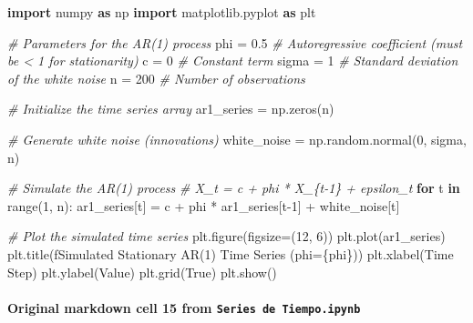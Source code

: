 \documentclass[
  11pt,
]{article}
\newenvironment{Shaded}{}{}
\newcommand{\BuiltInTok}[1]{\textcolor[rgb]{0.00,0.50,0.00}{#1}}
\newcommand{\CommentTok}[1]{\textcolor[rgb]{0.38,0.63,0.69}{\textit{#1}}}
\newcommand{\ControlFlowTok}[1]{\textcolor[rgb]{0.00,0.44,0.13}{\textbf{#1}}}
\newcommand{\DecValTok}[1]{\textcolor[rgb]{0.25,0.63,0.44}{#1}}
\newcommand{\FloatTok}[1]{\textcolor[rgb]{0.25,0.63,0.44}{#1}}
\newcommand{\ImportTok}[1]{\textcolor[rgb]{0.00,0.50,0.00}{\textbf{#1}}}
\newcommand{\KeywordTok}[1]{\textcolor[rgb]{0.00,0.44,0.13}{\textbf{#1}}}
\newcommand{\NormalTok}[1]{#1}
\newcommand{\OperatorTok}[1]{\textcolor[rgb]{0.40,0.40,0.40}{#1}}
\newcommand{\SpecialCharTok}[1]{\textcolor[rgb]{0.25,0.44,0.63}{#1}}
\newcommand{\SpecialStringTok}[1]{\textcolor[rgb]{0.73,0.40,0.53}{#1}}
\newcommand{\StringTok}[1]{\textcolor[rgb]{0.25,0.44,0.63}{#1}}
\newcommand{\VariableTok}[1]{\textcolor[rgb]{0.10,0.09,0.49}{#1}}
\begin{document}
\begin{Shaded}
\begin{Highlighting}[]
\ImportTok{import}\NormalTok{ numpy }\ImportTok{as}\NormalTok{ np}
\ImportTok{import}\NormalTok{ matplotlib.pyplot }\ImportTok{as}\NormalTok{ plt}

\CommentTok{\# Parameters for the AR(1) process}
\NormalTok{phi }\OperatorTok{=} \FloatTok{0.5}  \CommentTok{\# Autoregressive coefficient (must be \textless{} 1 for stationarity)}
\NormalTok{c }\OperatorTok{=} \DecValTok{0}    \CommentTok{\# Constant term}
\NormalTok{sigma }\OperatorTok{=} \DecValTok{1}  \CommentTok{\# Standard deviation of the white noise}
\NormalTok{n }\OperatorTok{=} \DecValTok{200}    \CommentTok{\# Number of observations}

\CommentTok{\# Initialize the time series array}
\NormalTok{ar1\_series }\OperatorTok{=}\NormalTok{ np.zeros(n)}

\CommentTok{\# Generate white noise (innovations)}
\NormalTok{white\_noise }\OperatorTok{=}\NormalTok{ np.random.normal(}\DecValTok{0}\NormalTok{, sigma, n)}

\CommentTok{\# Simulate the AR(1) process}
\CommentTok{\# X\_t = c + phi * X\_\{t{-}1\} + epsilon\_t}
\ControlFlowTok{for}\NormalTok{ t }\KeywordTok{in} \BuiltInTok{range}\NormalTok{(}\DecValTok{1}\NormalTok{, n):}
\NormalTok{    ar1\_series[t] }\OperatorTok{=}\NormalTok{ c }\OperatorTok{+}\NormalTok{ phi }\OperatorTok{*}\NormalTok{ ar1\_series[t}\OperatorTok{{-}}\DecValTok{1}\NormalTok{] }\OperatorTok{+}\NormalTok{ white\_noise[t]}

\CommentTok{\# Plot the simulated time series}
\NormalTok{plt.figure(figsize}\OperatorTok{=}\NormalTok{(}\DecValTok{12}\NormalTok{, }\DecValTok{6}\NormalTok{))}
\NormalTok{plt.plot(ar1\_series)}
\NormalTok{plt.title(}\SpecialStringTok{f\textquotesingle{}Simulated Stationary AR(1) Time Series (phi=}\SpecialCharTok{\{}\NormalTok{phi}\SpecialCharTok{\}}\SpecialStringTok{)\textquotesingle{}}\NormalTok{)}
\NormalTok{plt.xlabel(}\StringTok{\textquotesingle{}Time Step\textquotesingle{}}\NormalTok{)}
\NormalTok{plt.ylabel(}\StringTok{\textquotesingle{}Value\textquotesingle{}}\NormalTok{)}
\NormalTok{plt.grid(}\VariableTok{True}\NormalTok{)}
\NormalTok{plt.show()}
\end{Highlighting}
\end{Shaded}

\paragraph{\texorpdfstring{Original markdown cell 15 from \texttt{Series\ de\ Tiempo.ipynb}}{Original markdown cell 15 from Series de Tiempo.ipynb}}\label{original-markdown-cell-15-from-series-de-tiempoipynb}
\end{document}
